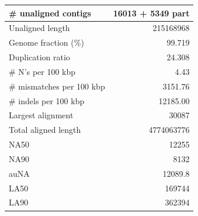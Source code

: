 \documentclass[12pt,a4paper]{article}
\begin{document}
\begin{table}[ht]
\begin{center}
\begin{tabular}{|l*{1}{|r}|}
\# unaligned contigs & 16013 + 5349 part \\ \hline
Unaligned length & 215168968 \\ \hline
Genome fraction (\%) & 99.719 \\ \hline
Duplication ratio & 24.308 \\ \hline
\# N's per 100 kbp & 4.43 \\ \hline
\# mismatches per 100 kbp & 3151.76 \\ \hline
\# indels per 100 kbp & 12185.00 \\ \hline
Largest alignment & 30087 \\ \hline
Total aligned length & 4774063776 \\ \hline
NA50 & 12255 \\ \hline
NA90 & 8132 \\ \hline
auNA & 12089.8 \\ \hline
LA50 & 169744 \\ \hline
LA90 & 362394 \\ \hline
\end{tabular}
\end{center}
\end{table}
\end{document}
